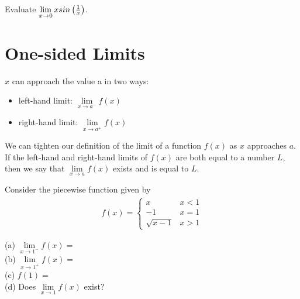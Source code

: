 \begin{exercise}\nonumber
	Evaluate $ \lim\limits_{x \rightarrow 0}xsin\left({1 \over x}\right) $. \\
	\vspace{6cm}
\end{exercise}

\section{One-sided Limits}

$ x $ can approach the value a in two ways: \\

\begin{itemize}
	\item
	      left-hand limit: $ \lim\limits_{x \rightarrow a^-}f(x) $ \\

	\item
	      right-hand limit: $ \lim\limits_{x \rightarrow a^+}f(x) $ \\
\end{itemize}

We can tighten our definition of the limit of a function $ f(x) $ as $ x $ approaches $ a $. If the left-hand and right-hand limits of $ f(x) $ are both equal to a number $ L $, then we say that $ \lim\limits_{x \rightarrow a}f(x) $ exists and is equal to $ L $. \\

\begin{exercise}\nonumber
	Consider the piecewise function given by \\
	\begin{align}
		f(x) = \begin{cases}
			x          & x < 1 \\
			-1         & x = 1 \\
			\sqrt{x-1} & x > 1
		\end{cases}
	\end{align}

	(a) $ \lim\limits_{x \rightarrow 1^-}f(x) = $ \\

	(b) $ \lim\limits_{x \rightarrow 1^+}f(x) = $ \\

	(c) $ f(1) =  $ \\

	(d) Does $ \lim\limits_{x \rightarrow 1}f(x) $ exist?
\end{exercise}

